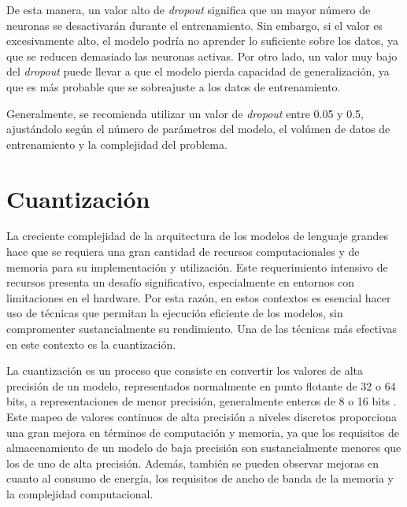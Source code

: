 \documentclass[11pt,spanish,listoffigures,listoftables]{tfgetsinf}
\begin{document}
De esta manera, un valor alto de \textit{dropout} significa que un mayor número de neuronas se desactivarán durante el entrenamiento. Sin embargo, si el valor es excesivamente alto, el modelo podría no aprender lo suficiente sobre los datos, ya que se reducen demasiado las neuronas activas. Por otro lado, un valor muy bajo del \textit{dropout} puede llevar a que el modelo pierda capacidad de generalización, ya que es más probable que se sobreajuste a los datos de entrenamiento.

Generalmente, se recomienda utilizar un valor de \textit{dropout} entre 0.05 y 0.5, ajustándolo según el número de parámetros del modelo, el volúmen de datos de entrenamiento y la complejidad del problema.


\section{Cuantización}

La creciente complejidad de la arquitectura de los modelos de lenguaje grandes hace que se requiera una gran cantidad de recursos computacionales y de memoria para su implementación y utilización. Este requerimiento intensivo de recursos presenta un desafío significativo, especialmente en entornos con limitaciones en el hardware. Por esta razón, en estos contextos es esencial hacer uso de técnicas que permitan la ejecución eficiente de los modelos, sin compromenter sustancialmente su rendimiento. Una de las técnicas más efectivas en este contexto es la cuantización.

La cuantización es un proceso que consiste en convertir los valores de alta  precisión de un modelo, representados normalmente en punto flotante de 32 o 64 bits, a representaciones de menor precisión, generalmente enteros de 8 o 16 bits \cite{choukroun2019low}. Este mapeo de valores continuos de alta precisión a niveles discretos proporciona una gran mejora en términos de computación y memoria, ya que los requisitos de almacenamiento de un modelo de baja precisión son sustancialmente menores que los de uno de alta precisión. Además, también se pueden observar mejoras en cuanto al consumo de energía, los requisitos de ancho de banda de la memoria y la complejidad computacional.
\end{document}
